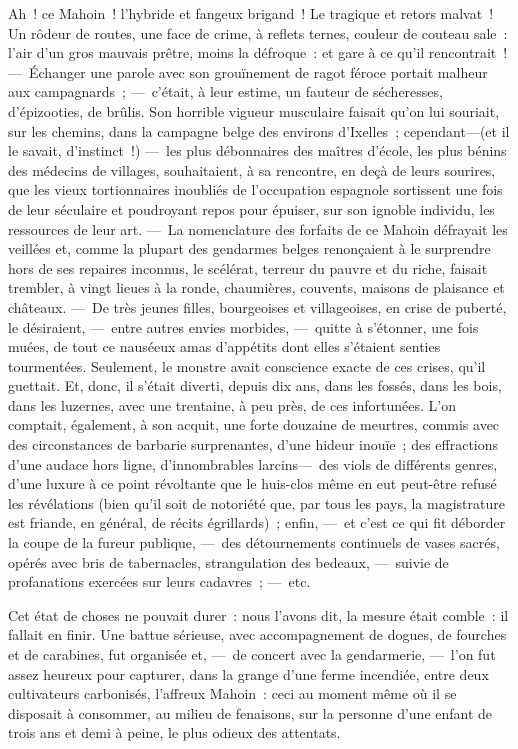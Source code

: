 \documentclass[french,twoside]{book} %
\newcommand{\bibl}[1]{{\RaggedLeft{#1}\par\bigskip}}
\begin{document}
\bibl{Edgar Allan Poe.}
\noindent Ah ! ce Mahoin ! l’hybride et fangeux brigand ! Le tragique et retors malvat ! Un rôdeur de routes, une face de crime, à reflets ternes, couleur de couteau sale : l’air d’un gros mauvais prêtre, moins la défroque : et gare à ce qu’il rencontrait ! — Échanger une parole avec son grouïnement de ragot féroce portait malheur aux campagnards ; — c’était, à leur estime, un fauteur de sécheresses, d’épizooties, de brûlis. Son horrible vigueur musculaire faisait qu’on lui souriait, sur les chemins, dans la campagne belge des environs d’Ixelles ; cependant—(et il le savait, d’instinct !) — les plus débonnaires des maîtres d’école, les plus bénins des médecins de villages,   souhaitaient, à sa rencontre, en deçà de leurs sourires, que les vieux tortionnaires inoubliés de l’occupation espagnole sortissent une fois de leur séculaire et poudroyant repos pour épuiser, sur son ignoble individu, les ressources de leur art. — La nomenclature des forfaits de ce Mahoin défrayait les veillées et, comme la plupart des gendarmes belges renonçaient à le surprendre hors de ses repaires inconnus, le scélérat, terreur du pauvre et du riche, faisait trembler, à vingt lieues à la ronde, chaumières, couvents, maisons de plaisance et châteaux. — De très jeunes filles, bourgeoises et villageoises, en crise de puberté, le désiraient, — entre autres envies morbides, — quitte à s’étonner, une fois muées, de tout ce nauséeux amas d’appétits dont elles s’étaient senties tourmentées. Seulement, le monstre avait conscience exacte de ces crises, qu’il guettait. Et, donc, il s’était diverti, depuis dix ans, dans les fossés, dans les bois, dans les luzernes, avec une trentaine, à peu près, de ces infortunées. L’on comptait, également, à son acquit, une forte douzaine de meurtres, commis avec des circonstances   de barbarie surprenantes, d’une hideur inouïe ; des effractions d’une audace hors ligne, d’innombrables larcins— des viols de différents genres, d’une luxure à ce point révoltante que le huis-clos même en eut peut-être refusé les révélations (bien qu’il soit de notoriété que, par tous les pays, la magistrature est friande, en général, de récits égrillards) ; enfin, — et c’est ce qui fit déborder la coupe de la fureur publique, — des détournements continuels de vases sacrés, opérés avec bris de tabernacles, strangulation des bedeaux, — suivie de profanations exercées sur leurs cadavres ; — etc.\par
Cet état de choses ne pouvait durer : nous l’avons dit, la mesure était comble : il fallait en finir. Une battue sérieuse, avec accompagnement de dogues, de fourches et de carabines, fut organisée et, — de concert avec la gendarmerie, — l’on fut assez heureux pour capturer, dans la grange d’une ferme incendiée, entre deux cultivateurs carbonisés, l’affreux Mahoin : ceci au moment même où il se disposait à consommer, au milieu de fenaisons, sur la personne d’une   enfant de trois ans et demi à peine, le plus odieux des attentats.\par
\end{document}

